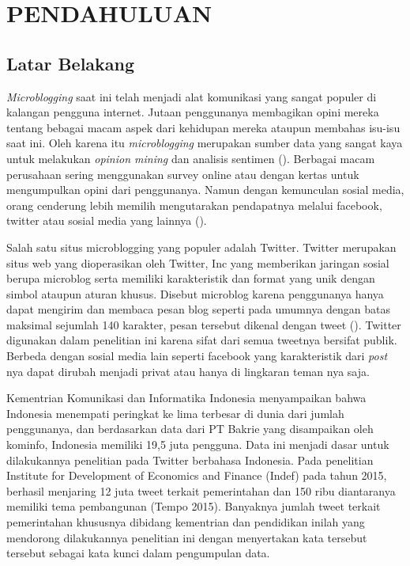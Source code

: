 \section*{PENDAHULUAN} %
\subsection*{Latar Belakang}

\textit{Microblogging} saat ini telah menjadi alat komunikasi yang sangat populer di kalangan pengguna internet. Jutaan penggunanya membagikan opini mereka tentang bebagai macam aspek dari kehidupan mereka ataupun membahas isu-isu saat ini. Oleh karena itu \textit{microblogging} merupakan sumber data yang sangat kaya untuk melakukan \textit{opinion mining} dan analisis sentimen \citeauthor{PAK10.385} (\cite*{PAK10.385}). Berbagai macam perusahaan sering menggunakan survey online atau dengan kertas untuk mengumpulkan opini dari penggunanya. Namun dengan kemunculan sosial media, orang cenderung lebih memilih mengutarakan pendapatnya melalui facebook, twitter atau sosial media yang lainnya (\cite{AnwarHridoy2015}).

Salah satu situs microblogging yang populer adalah Twitter. Twitter merupakan situs web yang dioperasikan oleh Twitter, Inc yang memberikan jaringan sosial berupa microblog serta memiliki karakteristik dan format yang unik dengan simbol ataupun aturan khusus. Disebut microblog karena penggunanya hanya dapat mengirim dan membaca pesan blog seperti pada umumnya dengan batas maksimal sejumlah 140 karakter, pesan tersebut dikenal dengan tweet (\cite{ZHANG2011}). Twitter digunakan dalam penelitian ini karena sifat dari semua tweetnya bersifat publik. Berbeda dengan sosial media lain seperti facebook yang karakteristik dari \textit{post} nya dapat dirubah menjadi privat atau hanya di lingkaran teman nya saja.

Kementrian Komunikasi dan Informatika Indonesia menyampaikan bahwa Indonesia menempati peringkat ke lima terbesar di dunia dari jumlah penggunanya, dan berdasarkan data dari PT Bakrie yang disampaikan oleh kominfo, Indonesia memiliki 19,5 juta pengguna. Data ini menjadi dasar untuk dilakukannya penelitian pada Twitter berbahasa Indonesia. Pada penelitian Institute for Development of Economics and Finance (Indef) pada tahun 2015, berhasil menjaring 12 juta tweet terkait pemerintahan dan 150 ribu diantaranya memiliki tema pembangunan (Tempo 2015). Banyaknya jumlah tweet terkait pemerintahan khususnya dibidang kementrian dan pendidikan inilah yang mendorong dilakukannya penelitian ini dengan menyertakan kata tersebut tersebut sebagai kata kunci dalam pengumpulan data.

